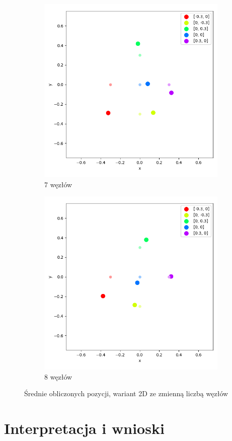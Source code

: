 \begin{figure}[H]
    \ContinuedFloat\centering
    \begin{subfigure}{.5\textwidth}
        \centering
        \includegraphics[width=\linewidth]{pics/mult_lat_2d_num/positions_7_mean.png}
        \caption{7 węzłów}
        \label{pic:2d_7_num_mult}
    \end{subfigure}%
    \begin{subfigure}{.5\textwidth}
        \centering
        \includegraphics[width=\linewidth]{pics/mult_lat_2d_num/positions_8_mean.png}
        \caption{8 węzłów}
        \label{pic:2d_8_num_mult}
    \end{subfigure}
    \caption{Średnie obliczonych pozycji, wariant 2D ze zmienną liczbą węzłów}
    \label{pic:2d_num_mult}
\end{figure}

\section{Interpretacja i wnioski}
